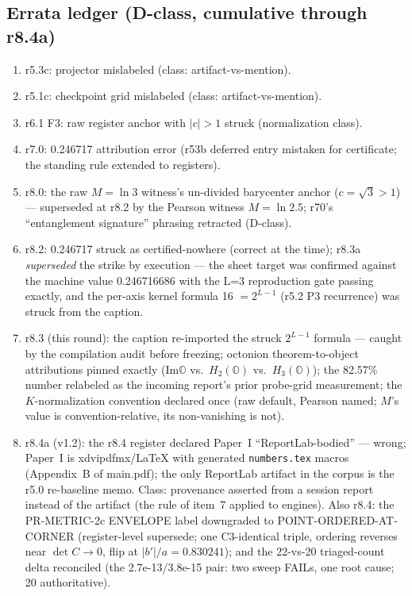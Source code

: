 \documentclass[11pt,a4paper]{article}
\theoremstyle{definition}
\begin{document}
\subsection*{Errata ledger (D-class, cumulative through r8.4a)}
\begin{enumerate}[leftmargin=1.6em]
\item r5.3c: projector mislabeled (class: artifact-vs-mention).
\item r5.1c: checkpoint grid mislabeled (class:
artifact-vs-mention).
\item r6.1 F3: raw register anchor with $|c| > 1$ struck
(normalization class).
\item r7.0: 0.246717 attribution error (r53b deferred entry
mistaken for certificate; the standing rule extended to
registers).
\item r8.0: the raw $M = \ln 3$ witness's un-divided barycenter
anchor ($c = \sqrt 3 > 1$) --- superseded at r8.2 by the Pearson
witness $M = \ln 2.5$; r70's ``entanglement signature'' phrasing
retracted (D-class).
\item r8.2: 0.246717 struck as certified-nowhere (correct at the
time); r8.3a \emph{superseded} the strike by execution --- the
sheet target was confirmed against the machine value 0.246716686
with the L=3 reproduction gate passing exactly, and the per-axis
kernel formula 16 $= 2^{L-1}$ (r5.2 P3 recurrence) was struck from
the caption.
\item r8.3 (this round): the caption re-imported the struck
$2^{L-1}$ formula --- caught by the compilation audit before
freezing; octonion theorem-to-object attributions pinned exactly
(Im$\mathbb O$ vs.\ $H_2(\mathbb O)$ vs.\ $H_3(\mathbb O)$); the
82.57\% number relabeled as the incoming report's prior
probe-grid measurement; the $K$-normalization convention
declared once (raw default, Pearson named; $M$'s value is
convention-relative, its non-vanishing is not).
\item r8.4a (v1.2): the r8.4 register declared Paper~I
``ReportLab-bodied'' --- wrong; Paper~I is xdvipdfmx/LaTeX with
generated \texttt{numbers.tex} macros (Appendix~B of main.pdf);
the only ReportLab artifact in the corpus is the r5.0 re-baseline
memo. Class: provenance asserted from a session report instead
of the artifact (the rule of item~7 applied to engines). Also
r8.4: the PR-METRIC-2c ENVELOPE label downgraded to
POINT-ORDERED-AT-CORNER (register-level supersede; one
C3-identical triple, ordering reverses near $\det C \to 0$, flip
at $|b'|/a = 0.830241$); and the 22-vs-20 triaged-count delta
reconciled (the 2.7e-13/3.8e-15 pair: two sweep FAILs, one root
cause; 20 authoritative).
\end{enumerate}
\end{document}
